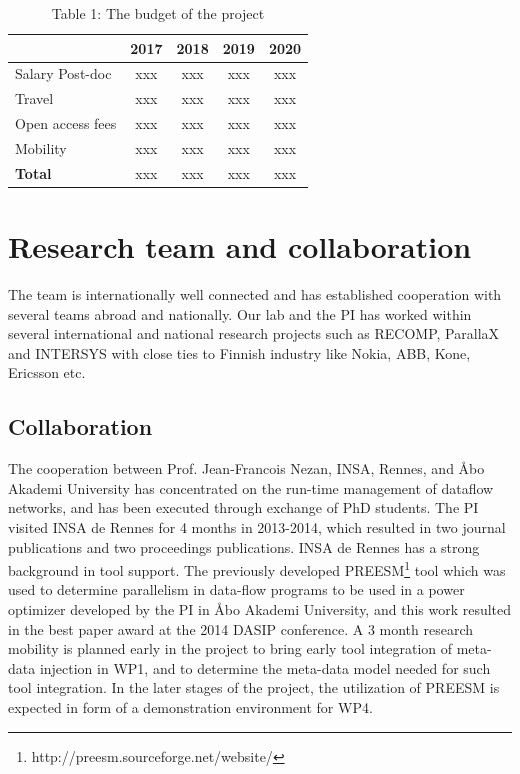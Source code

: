 \documentclass{article}
\begin{document}
\begin{table}
\vspace{-0.3cm}
\small
\begin{tabular}{ | l | c | c |c |c |}
\hline
& {2017} & {2018} & {2019} & {2020} \\ \hline
{Salary Post-doc} & xxx & xxx & xxx & xxx \\ \hline
{Travel} & xxx & xxx & xxx & xxx  \\ \hline
{Open access fees} & xxx & xxx & xxx & xxx  \\ \hline
{Mobility} & xxx & xxx & xxx & xxx  \\ \hline
{\textbf{Total}} & xxx & xxx & xxx & xxx  \\ \hline
\end{tabular}
\caption*{Table 1: The budget of the project}
\label{tab:budget}
\vspace{-0.5cm}
\end{table}

\section{Research team and collaboration}
The team is internationally well connected and has established cooperation with several teams abroad and nationally. 
Our lab and the PI has worked within several international and national research projects such as RECOMP, ParallaX and INTERSYS with close ties to Finnish industry like Nokia, ABB, Kone, Ericsson etc.

\subsection{Collaboration}
The cooperation between Prof. Jean-Francois Nezan, INSA, Rennes, and \AA{}bo Akademi University has concentrated on the run-time management of dataflow networks, 
and has been executed through exchange of PhD students.
The PI visited INSA de Rennes for 4 months in 2013-2014, which resulted in two journal publications and two proceedings publications.\smallskip
INSA de Rennes has a strong background in tool support. 
The previously developed PREESM\footnote{http://preesm.sourceforge.net/website/} tool which was used to determine parallelism in data-flow programs to be used in a power optimizer developed by the PI in \AA{}bo Akademi University, and this work resulted in the best paper award at the 2014 DASIP conference.
A 3 month research mobility is planned early in the project to bring early tool integration of meta-data injection in WP1, and to determine the meta-data model needed for such tool integration.
In the later stages of the project, the utilization of PREESM is expected in form of a demonstration environment for WP4.
\end{document}
